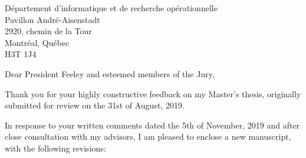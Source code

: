 \documentclass{letter}
\begin{document}
    \begin{letter}{D\'epartement d'informatique et de recherche op\'erationnelle \\ Pavillon Andr\'e-Aisenstadt \\ 2920, chemin de la Tour \\ Montr\'eal, Qu\'ebec \\ H3T 1J4}
        \opening{Dear President Feeley and esteemed members of the Jury,}
        Thank you for your highly constructive feedback on my Master's thesis, originally submitted for review on the 31st of August, 2019.

        In response to your written comments dated the 5th of November, 2019 and after close consultation with my advisors, I am pleased to enclose a new manuscript, with the following revisions:


\end{letter}
\end{document}

